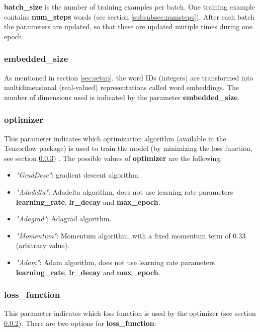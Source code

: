 \documentclass[10pt,a4paper,titlepage]{article}
\begin{document}
\textbf{batch\_size} is the number of training examples per batch. One training example contains \textbf{num\_steps} words (see section \ref{subsubsec:numsteps}). After each batch the parameters are updated, so that these are updated mutiple times during one epoch.

\subsubsection{embedded\_size}

As mentioned in section \ref{sec:setup}, the word IDs (integers) are transformed into multidimensional (real-valued) representations called word embeddings. The number of dimensions used is indicated by the parameter \textbf{embedded\_size}.

\subsubsection{optimizer}
\label{subsubsec:opt}

This parameter indicates which optimization algorithm (available in the Tensorflow package) is used to train the model (by minimizing the loss function, see section \ref{subsubsec:loss}) \cite{opt}. The possible values of \textbf{optimizer} are the following:

\begin{itemize}

	\item \textit{"GradDesc"}: gradient descent algorithm.
	\item \textit{"Adadelta"}: Adadelta algorithm, does not use learning rate parameters \textbf{learning\_rate}, \textbf{lr\_decay} and \textbf{max\_epoch}.
	\item \textit{"Adagrad"}: Adagrad algorithm.
	\item \textit{"Momentum"}: Momentum algorithm, with a fixed momentum term of 0.33 (arbitrary value).
	\item \textit{"Adam"}: Adam algorithm, does not use learning rate parameters \textbf{learning\_rate}, \textbf{lr\_decay} and \textbf{max\_epoch}.	

\end{itemize}

\subsubsection{loss\_function}
\label{subsubsec:loss}

This parameter indicates which loss function is used by the optimizer (see section \ref{subsubsec:opt}). There are two options for \textbf{loss\_function}:
\end{document}
